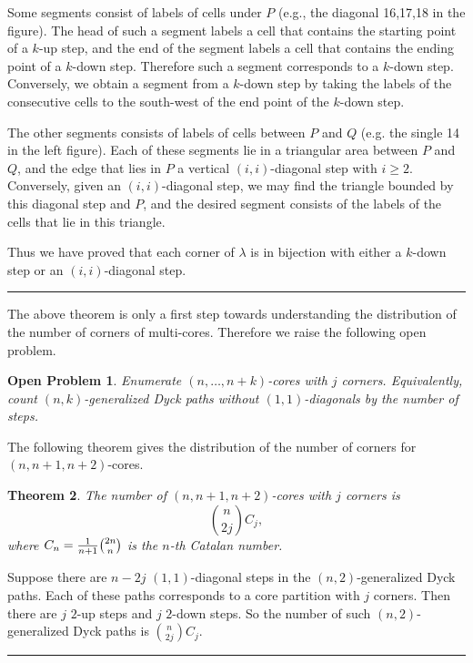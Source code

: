 \documentclass[a4paper,12pt]{article}
\def\proof{\noindent {\it{Proof.} \hskip 2pt}}
\newtheorem{thm}{Theorem}[section]
\newtheorem{openproblem}[thm]{Open Problem}
\newcommand{\qed}{{\hfill\rule{4pt}{7pt}}}
\begin{document}
Some segments consist of labels of cells under $P$ (e.g., the diagonal 16,17,18 in the figure). The head of such a  segment labels a cell that contains the starting point of a  $k$-up step, and the end of the segment labels a cell that contains the ending point of a $k$-down step. Therefore such a segment corresponds to a $k$-down step. Conversely, we obtain a segment from a $k$-down step by taking the labels of the consecutive cells to the south-west of the end point of the $k$-down step.

 The other segments consists of labels of cells between $P$ and $Q$ (e.g. the single 14 in the left figure). Each of these segments lie in a triangular area between $P$ and $Q$, and the edge that lies in $P$ a  vertical $(i,i)$-diagonal step with $i\geq 2$. Conversely, given an $(i,i)$-diagonal step, we may find the triangle bounded by this diagonal step and $P$, and the desired segment consists of the  labels of the cells that lie in this triangle.

Thus we have proved  that each corner of $\lambda$ is in bijection with either a $k$-down step or an $(i,i)$-diagonal step.
\qed

The above theorem is only a first step towards understanding the distribution of the number of corners of multi-cores. Therefore we raise the following open problem.


\begin{openproblem}
  Enumerate $(n,\ldots,n+k)$-cores with $j$ corners. Equivalently, count $(n,k)$-generalized Dyck paths without $(1,1)$-diagonals by the number of steps.
\end{openproblem}


The following theorem gives the distribution of the number of corners for $(n,n+1,n+2)$-cores.
\begin{thm}
  The number of $(n,n+1,n+2)$-cores with $j$ corners is
  \begin{equation} \label{3multiCoreCornerj}
    {n \choose 2j} C_{j},
  \end{equation}
where $C_n={1\over n+1} {2n\choose n }$ is the $n$-th Catalan number.
\end{thm}

\proof Suppose there are $n-2j$ $(1,1)$-diagonal steps in the $(n,2)$-generalized Dyck paths. Each of these paths corresponds to a core partition with $j$ corners.  Then there are $j$ $2$-up steps and $j$ $2$-down steps. So the number of such $(n,2)$-generalized Dyck paths is $ {n \choose 2j} C_{j}.$
\qed
\end{document}
